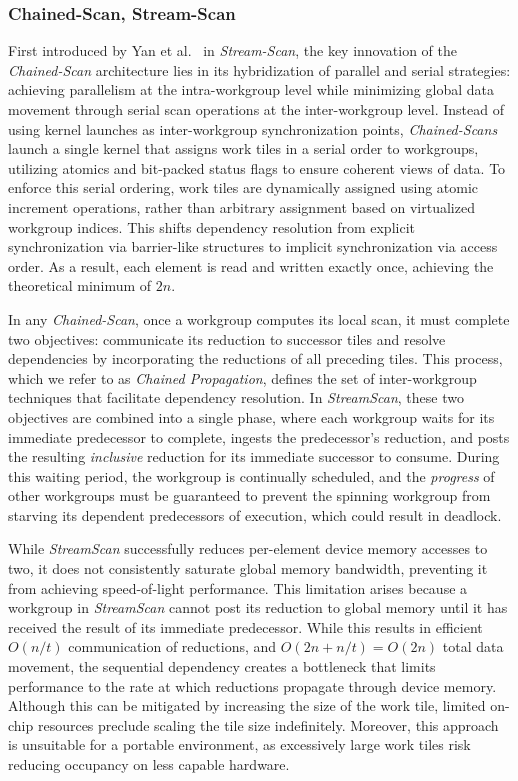\documentclass[sigconf]{acmart}
\begin{document}
\subsubsection{Chained-Scan, Stream-Scan}
First introduced by Yan et al.~\cite{10.1145/2442516.2442539} in \emph{Stream-Scan}, the key innovation of the \emph{Chained-Scan} architecture lies in its hybridization of parallel and serial strategies: achieving parallelism at the intra-workgroup level while minimizing global data movement through serial scan operations at the inter-workgroup level. Instead of using kernel launches as inter-workgroup synchronization points, \emph{Chained-Scans} launch a single kernel that assigns work tiles in a serial order to workgroups, utilizing atomics and bit-packed status flags to ensure coherent views of data. To enforce this serial ordering, work tiles are dynamically assigned using atomic increment operations, rather than arbitrary assignment based on virtualized workgroup indices. This shifts dependency resolution from explicit synchronization via barrier-like structures to implicit synchronization via access order. As a result, each element is read and written exactly once, achieving the theoretical minimum of $2n$.

In any \emph{Chained-Scan}, once a workgroup computes its local scan, it must complete two objectives: communicate its reduction to successor tiles and resolve dependencies by incorporating the reductions of all preceding tiles. This process, which we refer to as \emph{Chained Propagation}, defines the set of inter-workgroup techniques that facilitate dependency resolution. In \emph{StreamScan}, these two objectives are combined into a single phase, where each workgroup waits for its immediate predecessor to complete, ingests the predecessor's reduction, and posts the resulting \emph{inclusive} reduction for its immediate successor to consume. During this waiting period, the workgroup is continually scheduled, and the \emph{progress} of other workgroups must be guaranteed to prevent the spinning workgroup from starving its dependent predecessors of execution, which could result in deadlock.

While \emph{StreamScan} successfully reduces per-element device memory accesses to two, it does not consistently saturate global memory bandwidth, preventing it from achieving speed-of-light performance. This limitation arises because a workgroup in \emph{StreamScan} cannot post its reduction to global memory until it has received the result of its immediate predecessor. While this results in efficient $O(n/t)$ communication of reductions, and $O(2n+ n/t)= O(2n)$ total data movement, the sequential dependency creates a bottleneck that limits performance to the rate at which reductions propagate through device memory. Although this can be mitigated by increasing the size of the work tile, limited on-chip resources preclude scaling the tile size indefinitely. Moreover, this approach is unsuitable for a portable environment, as excessively large work tiles risk reducing occupancy on less capable hardware.
\end{document}
